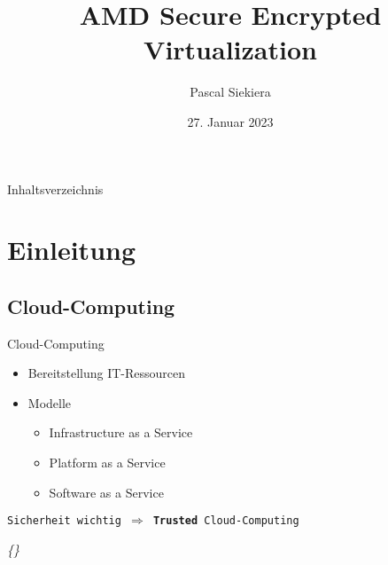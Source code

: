 \documentclass{sdqbeamer}
\title[AMD Secure Encrypted Virtualization]{AMD Secure Encrypted Virtualization}
\author[Pascal Siekiera]{Pascal Siekiera}
\date[27.\,01.\,2023]{27. Januar 2023}
\begin{document}
\KITtitleframe

\begin{frame}{Inhaltsverzeichnis}
\tableofcontents
\end{frame}


\section{Einleitung}

\subsection{Cloud-Computing}
\begin{frame}{Cloud-Computing}
	\begin{itemize}
		\item Bereitstellung IT-Ressourcen
		\item Modelle
		\begin{itemize}
			\item Infrastructure as a Service
			\item Platform as a Service
			\item Software as a Service
		\end{itemize}
	\end{itemize}

	\begin{greenblock}{}
		\texttt{Sicherheit wichtig \(\Rightarrow\) \textbf{Trusted} Cloud-Computing}
		\end{greenblock}

	\vfill
	\textit{\{\cite{bechtold, ibm, weis}\}}
\end{frame}
\end{document}
